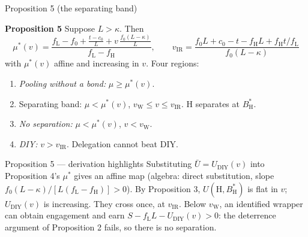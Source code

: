 \documentclass[11pt,aspectratio=169]{beamer}
\newcommand{\Ht}{\mathrm{H}}
\newcommand{\fH}{f_{\mathrm{H}}}
\newcommand{\fL}{f_{\mathrm{L}}}
\newcommand{\BH}{B^{*}_{\mathrm{H}}}
\newcommand{\Ubar}{\bar U}
\newcommand{\vIR}{v_{\mathrm{IR}}}
\newcommand{\vW}{v_{\mathrm{W}}}
\newcommand{\UDIY}{U_{\mathrm{DIY}}}
\newcommand{\PropTitle}[1]{\textbf{Proposition #1}}
\begin{document}
\begin{frame}{Proposition 5 (the separating band)}
\begin{exampleblock}{\PropTitle{5}}
Suppose $L>\kappa$. Then
\begin{equation*}
  \mu^{*}(v)=\frac{\fL-f_0+\frac{t-c_0}{L}+v\,\frac{f_0(L-\kappa)}{L}}{\fL-\fH},\qquad
  \vIR=\frac{f_0L+c_0-t-\fH L+\fH t/\fL}{f_0(L-\kappa)}
\end{equation*}
with $\mu^*(v)$ affine and increasing in $v$. Four regions:
\begin{enumerate}
  \item[(a)] \emph{Pooling without a bond:} $\mu\ge\mu^*(v)$.
  \item[(b)] \alert{Separating band:} $\mu<\mu^*(v)$, $\vW\le v\le\vIR$. $\Ht$ separates at $\BH$.
  \item[(c)] \emph{No separation:} $\mu<\mu^*(v)$, $v<\vW$.
  \item[(d)] \emph{DIY:} $v>\vIR$. Delegation cannot beat DIY.
\end{enumerate}
\end{exampleblock}
\end{frame}

\begin{frame}{Proposition 5 --- derivation highlights}
Substituting $\Ubar=\UDIY(v)$ into Proposition 4's $\mu^*$ gives an affine map (algebra: direct substitution, slope $f_0(L-\kappa)/[L(\fL-\fH)]>0$).
\pause
\vspace{6pt}
By Proposition 3, $U(\Ht,\BH)$ is \alert{flat} in $v$; $\UDIY(v)$ is increasing. They cross once, at $\vIR$.
\pause
\vspace{6pt}
Below $\vW$, an identified wrapper can obtain engagement and earn $S-\fL L-\UDIY(v)>0$: the deterrence argument of Proposition 2 fails, so there is no separation.
\end{frame}
\end{document}
